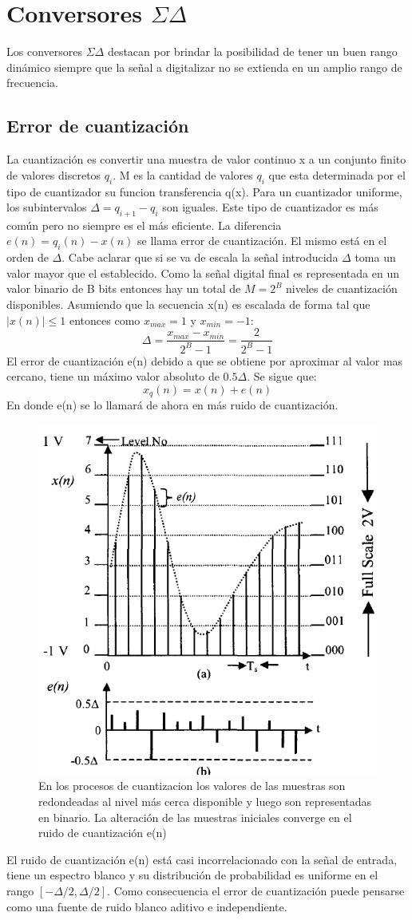 \documentclass[assd_tp3_main.tex]{subfiles}
\begin{document}
\section{Conversores $\Sigma\Delta$}
Los conversores $\Sigma\Delta$ destacan por brindar la posibilidad de tener un buen rango dinámico siempre que
la señal a digitalizar no se extienda en un amplio rango de frecuencia.
\subsection{Error de cuantización}
La cuantización es convertir una muestra de valor continuo x a un conjunto finito de valores discretos $q_i$.
M es la cantidad de valores $q_i$ que esta determinada por el tipo de cuantizador  su funcion transferencia q(x).
Para un cuantizador uniforme, los subintervalos $\Delta=q_{i+1}-q_i$ son iguales. Este tipo de cuantizador es más común pero no siempre es el más eficiente.
La diferencia $e(n)=q_i(n)-x(n)$ se llama error de cuantización. El mismo está en el orden de $\Delta$.
Cabe aclarar que si se va de escala la señal introducida $\Delta$ toma un valor mayor que el establecido.
Como la señal digital final es representada en un valor binario de B bits entonces hay un total de $M=2^{B}$ niveles de cuantización disponibles.
Asumiendo que la secuencia x(n) es escalada de forma tal que $|x(n)|\leq1$ entonces como $x_{max} =1$ y $x_{min} =-1$:
\[ \Delta=\frac{x_{max}-x_{min}}{2^B-1} = \frac{2}{2^B-1} \]
El error de cuantización e(n) debido a que se obtiene por aproximar al valor mas cercano, tiene un máximo valor absoluto de $0.5\Delta$.
Se sigue que:
\[ x_q(n)= x(n)+e(n)\]
En donde e(n) se lo llamará de ahora en más ruido de cuantización.
\begin{figure}[H]
\centering
\includegraphics[width=0.52\linewidth]{images/ej4/quant_err.png}
\caption{En los procesos de cuantizacion los valores de las muestras son redondeadas al nivel más cerca disponible y luego son representadas en binario. La alteración de las muestras iniciales converge en el ruido de cuantización e(n)}
\label{fig:quant_err}
\end{figure}
El ruido de cuantización e(n) está casi incorrelacionado con la señal de entrada, tiene un espectro blanco y su distribución de probabilidad es uniforme en el rango $[-\Delta/2,\Delta/2]$.
Como consecuencia el error de cuantización puede pensarse como una fuente de ruido blanco aditivo e independiente.
\end{document}
